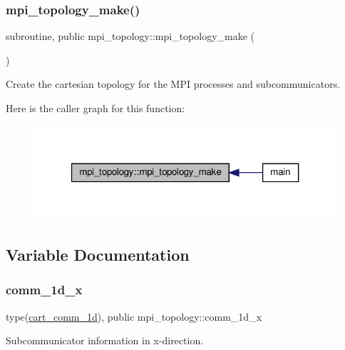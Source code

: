 \subsubsection{\texorpdfstring{mpi\+\_\+topology\+\_\+make()}{mpi\_topology\_make()}}
{\footnotesize\ttfamily subroutine, public mpi\+\_\+topology\+::mpi\+\_\+topology\+\_\+make (\begin{DoxyParamCaption}{ }\end{DoxyParamCaption})}



Create the cartesian topology for the M\+PI processes and subcommunicators. 

Here is the caller graph for this function\+:
\nopagebreak
\begin{figure}[H]
\begin{center}
\leavevmode
\includegraphics[width=321pt]{namespacempi__topology_a8819f16f50aded913f17520a29d3ec4c_icgraph}
\end{center}
\end{figure}


\subsection{Variable Documentation}
\mbox{\label{namespacempi__topology_a4ef8d80f442649d77707d5ebeeefa391}} 
\subsubsection{\texorpdfstring{comm\+\_\+1d\+\_\+x}{comm\_1d\_x}}
{\footnotesize\ttfamily type(\hyperlink{structmpi__topology_1_1cart__comm__1d}{cart\+\_\+comm\+\_\+1d}), public mpi\+\_\+topology\+::comm\+\_\+1d\+\_\+x}



Subcommunicator information in x-\/direction. 

\mbox{\label{namespacempi__topology_ad48a88602b9b9950200733823f95b5d0}} 
